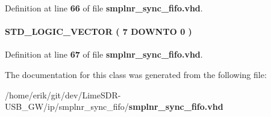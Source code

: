 Definition at line {\bf 66} of file {\bf smplnr\+\_\+sync\+\_\+fifo.\+vhd}.

\paragraph[{sub\+\_\+wire4}]{ {\bfseries \textcolor{comment}{S\+T\+D\+\_\+\+L\+O\+G\+I\+C\+\_\+\+V\+E\+C\+T\+OR}\textcolor{vhdlchar}{ }\textcolor{vhdlchar}{(}\textcolor{vhdlchar}{ }\textcolor{vhdlchar}{ } \textcolor{vhdldigit}{7} \textcolor{vhdlchar}{ }\textcolor{keywordflow}{D\+O\+W\+N\+TO}\textcolor{vhdlchar}{ }\textcolor{vhdlchar}{ } \textcolor{vhdldigit}{0} \textcolor{vhdlchar}{ }\textcolor{vhdlchar}{)}\textcolor{vhdlchar}{ }} \hspace{0.3cm}{\ttfamily [Signal]}}\label{classsmplnr__sync__fifo_1_1SYN_a209a84dd99b10e20f473d3ee9d40b541}


Definition at line {\bf 67} of file {\bf smplnr\+\_\+sync\+\_\+fifo.\+vhd}.



The documentation for this class was generated from the following file\+:\begin{DoxyCompactItemize}
\item 
/home/erik/git/dev/\+Lime\+S\+D\+R-\/\+U\+S\+B\+\_\+\+G\+W/ip/smplnr\+\_\+sync\+\_\+fifo/{\bf smplnr\+\_\+sync\+\_\+fifo.\+vhd}\end{DoxyCompactItemize}
